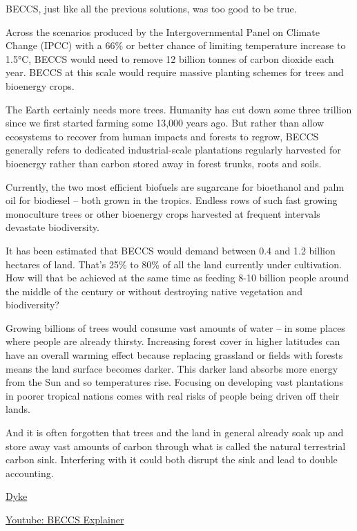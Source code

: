 \documentclass[
]{book}
\begin{document}
BECCS, just like all the previous solutions, was too good to be true.

Across the scenarios produced by the Intergovernmental Panel on Climate Change (IPCC) with a 66\% or better chance of limiting temperature increase to 1.5°C, BECCS would need to remove 12 billion tonnes of carbon dioxide each year. BECCS at this scale would require massive planting schemes for trees and bioenergy crops.

The Earth certainly needs more trees. Humanity has cut down some three trillion since we first started farming some 13,000 years ago. But rather than allow ecosystems to recover from human impacts and forests to regrow, BECCS generally refers to dedicated industrial-scale plantations regularly harvested for bioenergy rather than carbon stored away in forest trunks, roots and soils.

Currently, the two most efficient biofuels are sugarcane for bioethanol and palm oil for biodiesel -- both grown in the tropics. Endless rows of such fast growing monoculture trees or other bioenergy crops harvested at frequent intervals devastate biodiversity.

It has been estimated that BECCS would demand between 0.4 and 1.2 billion hectares of land. That's 25\% to 80\% of all the land currently under cultivation. How will that be achieved at the same time as feeding 8-10 billion people around the middle of the century or without destroying native vegetation and biodiversity?

Growing billions of trees would consume vast amounts of water -- in some places where people are already thirsty. Increasing forest cover in higher latitudes can have an overall warming effect because replacing grassland or fields with forests means the land surface becomes darker. This darker land absorbs more energy from the Sun and so temperatures rise. Focusing on developing vast plantations in poorer tropical nations comes with real risks of people being driven off their lands.

And it is often forgotten that trees and the land in general already soak up and store away vast amounts of carbon through what is called the natural terrestrial carbon sink. Interfering with it could both disrupt the sink and lead to double accounting.

\href{https://theconversation.com/climate-scientists-concept-of-net-zero-is-a-dangerous-trap-157368}{Dyke}

\href{https://www.youtube.com/watch?v=24ESlXSa1sU\&feature=emb_imp_woyt}{Youtube: BECCS Explainer}
\end{document}
